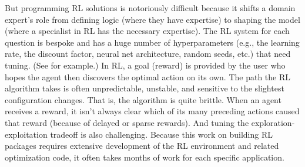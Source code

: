 \documentclass[mnsc,sglanonrev]{informs4}
\begin{document}


But programming RL solutions is notoriously difficult because it shifts a domain expert's role from defining logic (where they have expertise) to shaping the model (where a specialist in RL has the necessary expertise). The RL system for each question is bespoke and has a huge number of hyperparameters (e.g., the learning rate, the discount factor, neural net architecture, random seeds, etc.) that need tuning. (See  \cite{li_reinforcement_2022} for example.) In RL, a goal (reward) is provided by the user who hopes the agent then discovers the optimal action on its own. The path the RL algorithm takes is often unpredictable, unstable, and sensitive to the slightest configuration changes. That is, the algorithm is quite brittle. When an agent receives a reward, it isn't always clear which of its many preceding actions caused that reward (because of delayed or sparse rewards). And tuning the exploration-exploitation tradeoff is also challenging. Because this work on building RL packages requires extensive development of the RL environment and related optimization code, it often takes months of work for each specific application. 
\end{document}
